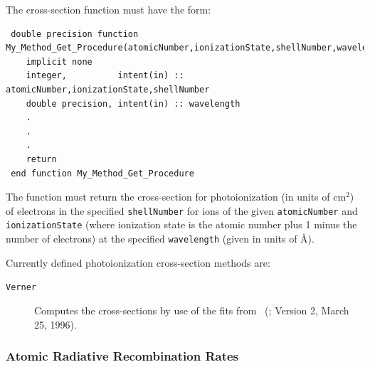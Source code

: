 The cross-section function must have the form:
\begin{verbatim}
 double precision function My_Method_Get_Procedure(atomicNumber,ionizationState,shellNumber,wavelength)
    implicit none
    integer,          intent(in) :: atomicNumber,ionizationState,shellNumber
    double precision, intent(in) :: wavelength
    .
    .
    .
    return
 end function My_Method_Get_Procedure
\end{verbatim}
The function must return the cross-section for photoionization (in units of cm$^2$) of electrons in the specified {\tt shellNumber} for ions of the given {\tt atomicNumber} and {\tt ionizationState} (where ionization state is the atomic number plus 1 minus the number of electrons) at the specified {\tt wavelength} (given in units of \AA).

Currently defined photoionization cross-section methods are:
\begin{description}
 \item [{\tt Verner}]  Computes the cross-sections by use of the fits from \citeauthor{verner_atomic_1996_1}~(\citeyear{verner_atomic_1996_1}; Version 2, March 25, 1996).
\end{description}

\subsubsection{Atomic Radiative Recombination Rates}

